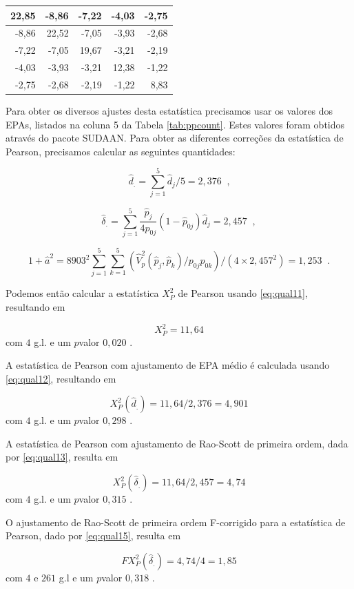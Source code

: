 \documentclass[]{book}
\theoremstyle{definition}
\theoremstyle{definition}
\theoremstyle{definition}
\theoremstyle{remark}
\begin{document}
\begin{tabular}{r|r|r|r|r}
\hline
22,85 & -8,86 & -7,22 & -4,03 & -2,75\\
\hline
-8,86 & 22,52 & -7,05 & -3,93 & -2,68\\
\hline
-7,22 & -7,05 & 19,67 & -3,21 & -2,19\\
\hline
-4,03 & -3,93 & -3,21 & 12,38 & -1,22\\
\hline
-2,75 & -2,68 & -2,19 & -1,22 & 8,83\\
\hline
\end{tabular}

Para obter os diversos ajustes desta estatística precisamos usar os
valores dos EPAs, listados na coluna 5 da Tabela \ref{tab:ppcount}.
Estes valores foram obtidos através do pacote SUDAAN. Para obter as
diferentes correções da estatística de Pearson, precisamos calcular as
seguintes quantidades:

\[
\hat{d}_{.}=\sum_{j=1}^{5}\hat{d}_{j}/5=2,376\;\;\mbox{,} 
\]

\[
\hat{\delta}_{.}=\sum_{j=1}^5\frac{\hat{p}_{j}}{4p_{0j}}
\left( 1-\hat{p}_{0j}\right) \hat{d}_{j}=2,457\;\;, 
\]

\[
1+\hat{a}^{2}=8903^{2}\sum\limits_{j=1}^{5}\sum\limits_{k=1}^{5}\left( \hat{V}_{p}^{2}\left( \hat{p}_{j},\hat{p}_{k}\right) /p_{0j}p_{0k}\right) /\left(
4\times 2,457^{2}\right) =1,253\;\;. 
\]

Podemos então calcular a estatística \(X_{P}^{2}\) de Pearson usando
\eqref{eq:qual11}, resultando em

\[
X_{P}^{2}=11,64 
\] com \(4\) g.l. e um \(p\)valor \(0,020\) .

A estatística de Pearson com ajustamento de EPA médio é calculada usando
\eqref{eq:qual12}, resultando em

\[
X_{P}^{2}\left( \hat{d}_{.}\right) =11,64/2,376=4,901 
\] com \(4\) g.l. e um \(p\)valor \(0,298\) .

A estatística de Pearson com ajustamento de Rao-Scott de primeira ordem,
dada por \eqref{eq:qual13}, resulta em

\[
X_{P}^{2}\left( \hat{\delta}_{.}\right) =11,64/2,457=4,74 
\] com \(4\) g.l. e um \(p\)valor \(0,315\) .

O ajustamento de Rao-Scott de primeira ordem F-corrigido para a
estatística de Pearson, dado por \eqref{eq:qual15}, resulta em

\[
FX_{P}^{2}\left( \hat{\delta}_{.}\right) =4,74/4=1,85
\] com \(4\) e \(261\) g.l e um \(p\)valor \(0,318\) .
\end{document}
